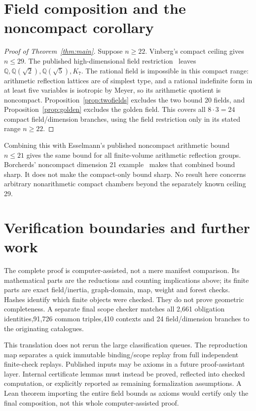 \documentclass[11pt]{article}
\newcommand{\Q}{\mathbb Q}
\begin{document}
\section{Field composition and the noncompact corollary}
\begin{proof}[Proof of Theorem~\ref{thm:main}]
Suppose $n\ge 22$. Vinberg's compact ceiling gives $n\le 29$.
The published high-dimensional field restriction~\cite{Vinberg,Nikulin} leaves
$\Q,\Q(\sqrt 2),\Q(\sqrt 5),K_7$. The rational field is impossible
in this compact range: arithmetic reflection lattices are of simplest
type, and a rational indefinite form in at least five variables is
isotropic by Meyer, so its arithmetic quotient is noncompact.
Proposition~\ref{prop:twofields} excludes the two bound 20 fields, and
Proposition~\ref{prop:golden} excludes the golden field. This covers all
$8\cdot 3=24$ compact field/dimension branches, using the field restriction
only in its stated range $n\ge 22$.
\end{proof}

Combining this with Esselmann's published noncompact arithmetic bound~\cite{Esselmann}
$n\le 21$ gives the same bound for all finite-volume arithmetic reflection
groups. Borcherds' noncompact dimension 21 example~\cite{Belolipetsky} makes that combined
bound sharp. It does not make the compact-only bound sharp. No result
here concerns arbitrary nonarithmetic compact chambers beyond the
separately known ceiling 29.

\section{Verification boundaries and further work}
The complete proof is computer-assisted, not a mere manifest comparison.
Its mathematical parts are the reductions and counting implications above;
its finite parts are exact field/inertia, graph-domain, map, weight and
forest checks. Hashes identify which finite objects were checked. They do
not prove geometric completeness. A separate final scope checker matches
all 2,661 obligation identities,91,726 common triples,410 contexts and 24
field/dimension branches to the originating catalogues.

This translation does not rerun the large classification queues. The
reproduction map separates a quick immutable binding/scope replay from
full independent finite-check replays. Published inputs may be axioms in
a future proof-assistant layer. Internal certificate lemmas must instead
be proved, reflected into checked computation, or explicitly reported as
remaining formalization assumptions. A Lean theorem importing the entire
field bounds as axioms would certify only the final composition, not this
whole computer-assisted proof.
\end{document}

